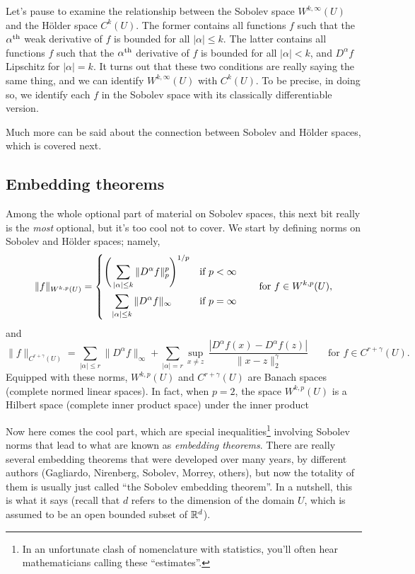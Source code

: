 \documentclass{article}
\begin{document}
Let's pause to examine the relationship between the Sobolev space
$W^{k,\infty}(U)$ and the H{\"o}lder space $C^k(U)$. The former contains all
functions $f$ such that the $\alpha^{\text{th}}$ weak derivative of $f$ is bounded for
all $|\alpha| \leq k$. The latter contains all functions $f$ such that the
$\alpha^{\text{th}}$ derivative of $f$ is bounded for all $|\alpha| < k$, and $D^\alpha
f$ Lipschitz for $|\alpha| = k$. It turns out that these two conditions are
really saying the same thing, and we can identify $W^{k,\infty}(U)$ with
$C^k(U)$. To be precise,  in doing so, we identify each $f$ in the Sobolev space
with its classically differentiable version.

Much more can be said about the connection between Sobolev and H{\"o}lder
spaces, which is covered next.


\subsection{Embedding theorems}

Among the whole optional part of material on Sobolev spaces, this next bit   
really is the \emph{most} optional, but it's too cool not to cover. We start by
defining norms on Sobolev and H{\"o}lder spaces; namely,
\[
\|f\|_{W^{k,p}(U)} = 
\begin{dcases} 
\Bigg( \sum_{|\alpha| \leq k} \|D^\alpha f\|_p^p \Bigg)^{1/p} & \text{if $p <
  \infty$} \\
\;\;\; \sum_{|\alpha| \leq k} \|D^\alpha f\|_\infty & \text{if $p = \infty$}   
\end{dcases}
\qquad \text{for $f \in W^{k,p}(U)$},
\]
and 
\[
\|f\|_{C^{r+\gamma}(U)} = \sum_{|\alpha| \leq r} \|D^\alpha f\|_\infty +
\sum_{|\alpha| = r} \sup_{x \not= z} \, \frac{|D^\alpha f(x) - D^\alpha f(z)|} 
{\|x-z\|_2^\gamma}
\qquad \text{for $f \in C^{r+\gamma}(U)$}. 
\] 
Equipped with these norms, $W^{k,p}(U)$ and $C^{r+\gamma}(U)$ are Banach 
spaces (complete normed linear spaces). In fact, when $p=2$, the space
$W^{k,p}(U)$ is a Hilbert space (complete inner product space) under the inner
product 

Now here comes the cool part, which are special inequalities\footnote{In an
  unfortunate clash of nomenclature with statistics, you'll often hear
  mathematicians calling these ``estimates''.} involving Sobolev norms that lead 
to what are known as \emph{embedding theorems}. There are really several
embedding theorems that were developed over many years, by different authors
(Gagliardo, Nirenberg, Sobolev, Morrey, others), but now the totality of them is
usually just called ``the Sobolev embedding theorem''. In a nutshell, this is
what it says (recall that $d$ refers to the dimension of the domain $U$, which
is assumed to be an open bounded subset of $\mathbb{R}^d$). 
\end{document}
